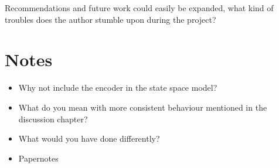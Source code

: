 \documentclass{article}
\begin{document}
Recommendations and future work could easily be expanded, what kind of troubles does the author stumble upon during the project?
\section{Notes}

\begin{itemize}
\item Why not include the encoder in the state space model?

\item What do you mean with more consistent behaviour mentioned in the discussion chapter?

\item What would you have done differently?

\item Papernotes

	
\end{itemize}
\end{document}
